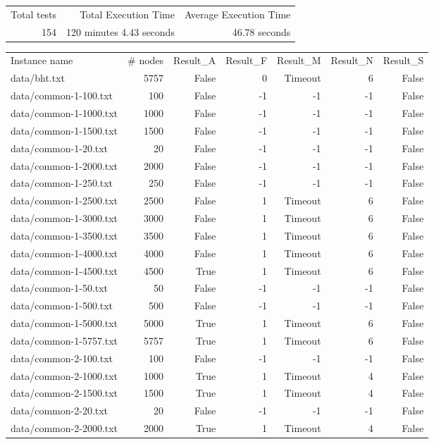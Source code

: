 \begin{tabular}{rrr}
Total tests & Total Execution Time & Average Execution Time \\
154 & 120 minutes 4.43 seconds & 46.78 seconds \\
\end{tabular}
\begin{tabular}{lrrrrrr}
Instance name & # nodes & Result_A & Result_F & Result_M & Result_N & Result_S \\
data/bht.txt & 5757 & False & 0 & Timeout & 6 & False \\
data/common-1-100.txt & 100 & False & -1 & -1 & -1 & False \\
data/common-1-1000.txt & 1000 & False & -1 & -1 & -1 & False \\
data/common-1-1500.txt & 1500 & False & -1 & -1 & -1 & False \\
data/common-1-20.txt & 20 & False & -1 & -1 & -1 & False \\
data/common-1-2000.txt & 2000 & False & -1 & -1 & -1 & False \\
data/common-1-250.txt & 250 & False & -1 & -1 & -1 & False \\
data/common-1-2500.txt & 2500 & False & 1 & Timeout & 6 & False \\
data/common-1-3000.txt & 3000 & False & 1 & Timeout & 6 & False \\
data/common-1-3500.txt & 3500 & False & 1 & Timeout & 6 & False \\
data/common-1-4000.txt & 4000 & False & 1 & Timeout & 6 & False \\
data/common-1-4500.txt & 4500 & True & 1 & Timeout & 6 & False \\
data/common-1-50.txt & 50 & False & -1 & -1 & -1 & False \\
data/common-1-500.txt & 500 & False & -1 & -1 & -1 & False \\
data/common-1-5000.txt & 5000 & True & 1 & Timeout & 6 & False \\
data/common-1-5757.txt & 5757 & True & 1 & Timeout & 6 & False \\
data/common-2-100.txt & 100 & False & -1 & -1 & -1 & False \\
data/common-2-1000.txt & 1000 & True & 1 & Timeout & 4 & False \\
data/common-2-1500.txt & 1500 & True & 1 & Timeout & 4 & False \\
data/common-2-20.txt & 20 & False & -1 & -1 & -1 & False \\
data/common-2-2000.txt & 2000 & True & 1 & Timeout & 4 & False \\

\end{tabular}

